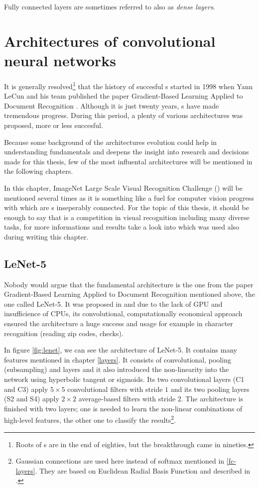 Fully connected layers are sometimes referred to also as \textit{dense layers}.

\section{Architectures of convolutional neural networks}
\label{cnn-architectures}

It is generally resolved\footnote{Roots of s are in the end of eighties, 
but the breakthrough came in nineties.} that the history of succesful s 
started in 1998 when Yann LeCun and his team published the paper Gradient-Based 
Learning Applied to Document Recognition \cite{lenet5}. Although it is just 
twenty years, s have made tremendous progress. During this period, a 
plenty of various architectures was proposed, more or less succesful.

Because some background of the  architectures evolution could help in 
understanding  fundamentals and deepens the insight into research and 
decisions made for this thesis, few of the most influental architectures will be 
mentioned in the following chapters.

In this chapter, ImageNet Large Scale Visual Recognition Challenge () 
will be mentioned several times as it is something like a fuel for computer 
vision progress with which are s inseperably connected. For the topic of 
this thesis, it should be enough to say that  is a competition in 
visual recognition including many diverse tasks, for more informations and 
results take a look into \cite{ILSVRC} which was used also during writing this 
chapter.

\subsection{LeNet-5} %
\label{lenet}

Nobody would argue that the fundamental architecture is the one from the paper 
Gradient-Based Learning Applied to Document Recognition mentioned above, the one 
called LeNet-5. It was proposed in \cite{lenet5} and due to the lack of GPU and 
insufficience of CPUs, its convolutional, computationally economical approach 
ensured the architecture a huge success and usage for example in character 
recognition (reading zip codes, checks). 

In figure \ref{fig:lenet}, we can see the architecture of LeNet-5. It contains 
many features mentioned in chapter \ref{layers}. It consists of convolutional, 
pooling (subsampling) and  layers and it also introduced the 
non-linearity into the network using hyperbolic tangent or sigmoids. Its two 
convolutional layers (C1 and C3) apply $5 \times 5$ convolutional filters with 
stride $1$ and its two pooling layers (S2 and S4) apply $2 \times 2$ 
average-based filters with stride $2$. The architecture is finished with two 
 layers; one is needed to learn the non-linear combinations of high-level 
features, the other one to classify the results\footnote{Gaussian connections 
are used here instead of softmax mentioned in \ref{fc-layers}. They are based on 
Euclidean Radial Basis Function and described in \cite{lenet5}.}.

